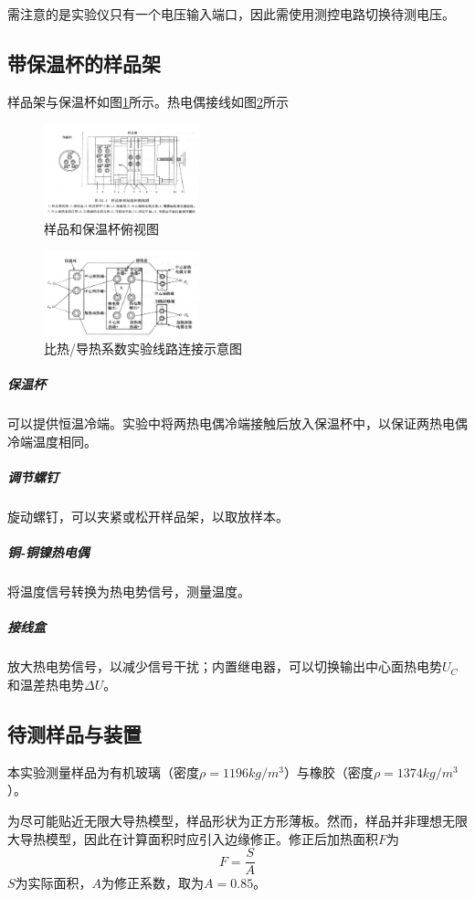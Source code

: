 \documentclass[10pt,a4paper,twocolumn,twoside,UTF8]{ctexart}
\begin{document}
	需注意的是实验仪只有一个电压输入端口，因此需使用测控电路切换待测电压。

	\subsection{带保温杯的样品架}
	样品架与保温杯如图\ref{fig:illus-3.1}所示。热电偶接线如图\ref{fig:illus-3.2}所示

	\begin{figure}[!h]
        \centering
        \includegraphics[width=0.4\textwidth]{img//3.jpg}
        \caption{样品和保温杯俯视图}
        \label{fig:illus-3.1}
    \end{figure}
	\begin{figure}[!h]
        \centering
        \includegraphics[width=0.4\textwidth]{img//4.jpg}
        \caption{比热/导热系数实验线路连接示意图}
        \label{fig:illus-3.2}
    \end{figure}

		\subparagraph*{保温杯} 可以提供恒温冷端。实验中将两热电偶冷端接触后放入保温杯中，以保证两热电偶冷端温度相同。
		\subparagraph*{调节螺钉} 旋动螺钉，可以夹紧或松开样品架，以取放样本。
		\subparagraph*{铜-铜镍热电偶} 将温度信号转换为热电势信号，测量温度。
		\subparagraph*{接线盒} 放大热电势信号，以减少信号干扰；内置继电器，可以切换输出中心面热电势$U_C$和温差热电势$\Delta U$。
	
    \subsection{待测样品与装置}
	本实验测量样品为有机玻璃（密度$\rho = 1196 kg/m^3$）与橡胶（密度$\rho = 1374 kg/m^3$）。

	为尽可能贴近无限大导热模型，样品形状为正方形薄板。然而，样品并非理想无限大导热模型，因此在计算面积时应引入边缘修正。修正后加热面积$F$为
	\begin{equation}
		F = \frac{S}{A}
	\end{equation}
	$S$为实际面积，$A$为修正系数，取为$A=0.85$。
\end{document}
